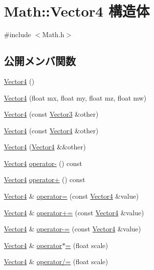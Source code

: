 \hypertarget{struct_math_1_1_vector4}{}\section{Math\+:\+:Vector4 構造体}
\label{struct_math_1_1_vector4}


{\ttfamily \#include $<$Math.\+h$>$}

\subsection*{公開メンバ関数}
\begin{DoxyCompactItemize}
\item 
\mbox{\hyperlink{struct_math_1_1_vector4_a511b4d9c8326c235b76d794eea018921}{Vector4}} ()
\item 
\mbox{\hyperlink{struct_math_1_1_vector4_af5f77f07dda167390f1e4995971a9511}{Vector4}} (float mx, float my, float mz, float mw)
\item 
\mbox{\hyperlink{struct_math_1_1_vector4_ab90ed6d952a51d132574f5459f2d43d4}{Vector4}} (const \mbox{\hyperlink{struct_math_1_1_vector3}{Vector3}} \&other)
\item 
\mbox{\hyperlink{struct_math_1_1_vector4_a5e32a459d47c732d9218a7967327007b}{Vector4}} (const \mbox{\hyperlink{struct_math_1_1_vector4}{Vector4}} \&other)
\item 
\mbox{\hyperlink{struct_math_1_1_vector4_a40bedb7beb32ba948ceb5c83d94e07c8}{Vector4}} (\mbox{\hyperlink{struct_math_1_1_vector4}{Vector4}} \&\&other)
\item 
\mbox{\hyperlink{struct_math_1_1_vector4}{Vector4}} \mbox{\hyperlink{struct_math_1_1_vector4_a96de40bc35b7b36658e8d7266def4125}{operator-\/}} () const
\item 
\mbox{\hyperlink{struct_math_1_1_vector4}{Vector4}} \mbox{\hyperlink{struct_math_1_1_vector4_a283dc1288b3f2bf4aa6e6f26ed4f6268}{operator+}} () const
\item 
\mbox{\hyperlink{struct_math_1_1_vector4}{Vector4}} \& \mbox{\hyperlink{struct_math_1_1_vector4_aba2c8eda695888041947200ea02846a9}{operator=}} (const \mbox{\hyperlink{struct_math_1_1_vector4}{Vector4}} \&value)
\item 
\mbox{\hyperlink{struct_math_1_1_vector4}{Vector4}} \& \mbox{\hyperlink{struct_math_1_1_vector4_ace1f44f6bf0b7a758bac3febb693d386}{operator+=}} (const \mbox{\hyperlink{struct_math_1_1_vector4}{Vector4}} \&value)
\item 
\mbox{\hyperlink{struct_math_1_1_vector4}{Vector4}} \& \mbox{\hyperlink{struct_math_1_1_vector4_abfc95eacc7b3fdb12824f41d8ac30835}{operator-\/=}} (const \mbox{\hyperlink{struct_math_1_1_vector4}{Vector4}} \&value)
\item 
\mbox{\hyperlink{struct_math_1_1_vector4}{Vector4}} \& \mbox{\hyperlink{struct_math_1_1_vector4_a759ab9b858421ca2d6de982af1e323b5}{operator$\ast$=}} (float scale)
\item 
\mbox{\hyperlink{struct_math_1_1_vector4}{Vector4}} \& \mbox{\hyperlink{struct_math_1_1_vector4_a4df28c9156a9cb0055d3b5a721df0360}{operator/=}} (float scale)
\end{DoxyCompactItemize}
